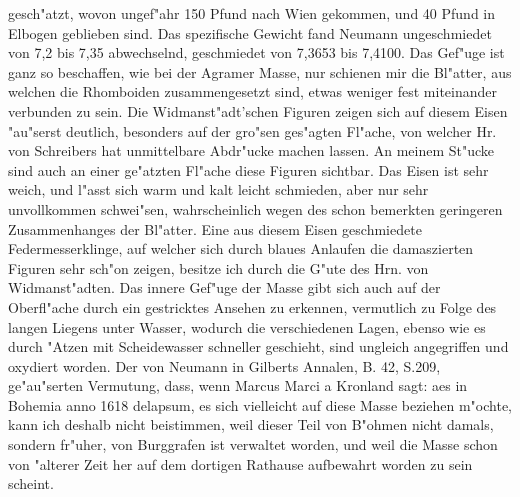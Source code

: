 \documentclass[a4paper, 11pt, oneside, polutonikogreek, german]{article}
\begin{document}
gesch"atzt, wovon ungef"ahr 150 Pfund nach Wien gekommen, und 40 Pfund in Elbogen geblieben sind. Das spezifische Gewicht fand Neumann ungeschmiedet von 7,2 bis 7,35 abwechselnd, geschmiedet von 7,3653 bis 7,4100. Das Gef"uge ist ganz so beschaffen, wie bei der Agramer Masse, nur schienen mir die Bl"atter, aus welchen die Rhomboiden zusammengesetzt sind, etwas weniger fest miteinander verbunden zu sein. Die Widmanst"adt'schen Figuren zeigen sich auf diesem Eisen "au"serst deutlich, besonders auf der gro"sen ges"agten Fl"ache, von welcher Hr. von Schreibers hat unmittelbare Abdr"ucke machen lassen. An meinem St"ucke sind auch an einer ge"atzten Fl"ache diese Figuren sichtbar. Das Eisen ist sehr weich, und l"asst sich warm und kalt leicht schmieden, aber nur sehr unvollkommen schwei"sen, wahrscheinlich wegen des schon bemerkten geringeren Zusammenhanges der Bl"atter. Eine aus diesem Eisen geschmiedete Federmesserklinge, auf welcher sich durch blaues Anlaufen die damaszierten Figuren sehr sch"on zeigen, besitze ich durch die G"ute des Hrn. von Widmanst"adten. Das innere Gef"uge der Masse gibt sich auch auf der Oberfl"ache durch ein gestricktes Ansehen zu erkennen, vermutlich zu Folge des langen Liegens unter Wasser, wodurch die verschiedenen Lagen, ebenso wie es durch "Atzen mit Scheidewasser schneller geschieht, sind ungleich angegriffen und oxydiert worden. Der von Neumann in Gilberts Annalen, B. 42, S.209, ge"au"serten Vermutung, dass, wenn Marcus Marci a Kronland sagt: aes in Bohemia anno 1618 delapsum, es sich vielleicht auf diese Masse beziehen m"ochte, kann ich deshalb nicht beistimmen, weil dieser Teil von B"ohmen nicht damals, sondern fr"uher, von Burggrafen ist verwaltet worden, und weil die Masse schon von "alterer Zeit her auf dem dortigen Rathause aufbewahrt worden zu sein scheint.
\end{document}
